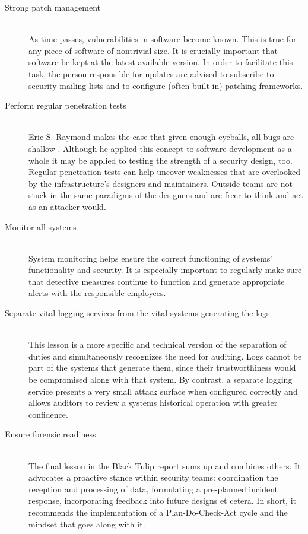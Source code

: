 \documentclass[a4paper]{llncs}
\begin{document}
\begin{description}
  \item[Strong patch management] \hfill \\
As time passes, vulnerabilities in software become known. This is true for any piece of software of nontrivial size. It is crucially important that software be kept at the latest available version. In order to facilitate this task, the person responsible for updates are advised to subscribe to security mailing lists and to configure (often built-in) patching frameworks.
  \item[Perform regular penetration tests] \hfill \\
Eric S. Raymond makes the case that given enough eyeballs, all bugs are shallow \cite{raymond1999cathedral}. Although he applied this concept to software development as a whole it may be applied to testing the strength of a security design, too. Regular penetration tests can help uncover weaknesses that are overlooked by the infrastructure’s designers and maintainers. Outside teams are not stuck in the same paradigms of the designers and are freer to think and act as an attacker would.
  \item[Monitor all systems] \hfill \\
System monitoring helps ensure the correct functioning of systems’ functionality and security. It is especially important to regularly make sure that detective measures continue to function and generate appropriate alerts with the responsible employees.
  \item[Separate vital logging services from the vital systems generating the logs] \hfill \\
This lesson is a more specific and technical version of the separation of duties and simultaneously recognizes the need for auditing. Logs cannot be part of the systems that generate them, since their trustworthiness would be compromised along with that system. By contrast, a separate logging service presents a very small attack surface when configured correctly and allows auditors to review a systems historical operation with greater confidence.  \item[Ensure forensic readiness] \hfill \\
The final lesson in the Black Tulip report sums up and combines others. It advocates a proactive stance within security teams: coordination the reception and processing of data, formulating a pre-planned incident response, incorporating feedback into future designs et cetera. In short, it recommends the implementation of a Plan-Do-Check-Act cycle and the mindset that goes along with it.
\end{description}
\end{document}
